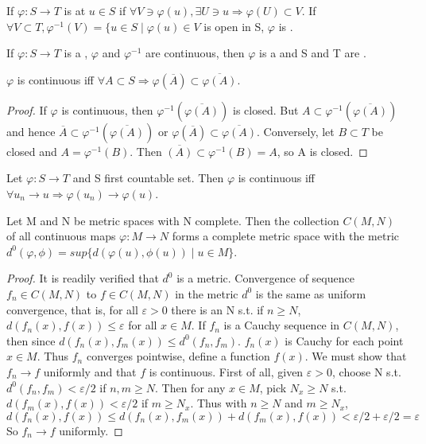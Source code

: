 \begin{definition}
If $\varphi:S\rightarrow T$ is  at $u\in S$ if $\forall V\ni\varphi(u),\exists U\ni u \Rightarrow \varphi(U)\subset V$.
If $\forall V\subset T, \varphi^{-1}(V)=\lbrace u\in S\mid \varphi(u)\in V$ is open in S, $\varphi$ is .
\end{definition}
If $\varphi:S\rightarrow T$ is a , $\varphi$ and $\varphi^{-1}$ are continuous, then $\varphi$ is a 
and S and T are .
\begin{prop}
$\varphi$ is continuous iff $\forall A\subset S \Rightarrow \varphi(\overline{A})\subset \overline{\varphi(A)}$.
\end{prop}
\begin{proof}
If $\varphi$ is continuous, then $\varphi^{-1}(\overline{\varphi(A)})$ is closed. But $A\subset \varphi^{-1}(\overline{\varphi(A)})$
and hence $\overline{A}\subset\varphi^{-1}(\overline{\varphi(A)})$ or $\varphi(\overline{A})\subset \overline{\varphi(A)}$. Conversely,
let $B\subset T$ be closed and $A=\varphi^{-1}(B)$. Then $\overline{(A)}\subset \varphi^{-1}(B)=A$, so A is closed.
\end{proof}
\begin{prop}
Let $\varphi:S\rightarrow T$ and S first countable set. Then $\varphi$ is continuous iff $\forall u_n\rightarrow u \Rightarrow \varphi(u_n)
\rightarrow \varphi(u)$.
\end{prop}
\begin{prop}
Let M and N be metric spaces with N complete. Then the collection $C(M,N)$ of all continuous maps $\varphi:M\rightarrow N$ forms a 
complete metric space with the metric $d^0(\varphi,\phi)=sup\lbrace d(\varphi(u),\phi(u))\mid u\in M\rbrace$.
\end{prop}
\begin{proof}
It is readily verified that $d^0$ is a metric. Convergence of sequence $f_n\in C(M,N)$ to $f\in C(M,N)$ in the metric $d^0$ is the
same as uniform convergence, that is, for all $\varepsilon > 0$ there is an N s.t. if $n\geq N$, $d(f_n(x),f(x))\leq \varepsilon$ for
all $x\in M$. If $f_n$ is a Cauchy sequence in $C(M,N)$, then since $d(f_n(x),f_m(x))\leq d^0(f_n,f_m)$. $f_n(x)$ is Cauchy for each
point $x\in M$. Thus $f_n$ converges pointwise, define a function $f(x)$. We must show that $f_n\rightarrow f$ uniformly and that $f$
is continuous. First of all, given $\varepsilon > 0$, choose N s.t. $d^0(f_n,f_m)<\varepsilon/2$ if $n,m\geq N$. Then for any $x\in M$,
pick $N_x\geq N$ s.t. $d(f_m(x),f(x))<\varepsilon/2$ if $m\geq N_x$. Thus with $n\geq N$ and $m\geq N_x$, $ d(f_n(x),f(x))\leq d(f_n(x),
f_m(x)) + d(f_m(x),f(x))<\varepsilon/2+\varepsilon/2=\varepsilon$ So $f_n\rightarrow f$ uniformly.
\end{proof}
